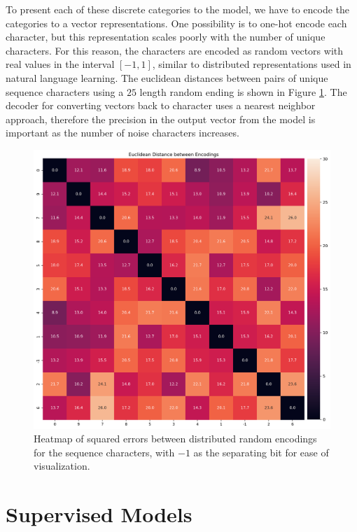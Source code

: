 \documentclass{article}
\begin{document}
To present each of these discrete categories to the model, we have to encode the categories to a vector representations. One possibility is to one-hot encode each character, but this representation scales poorly with the number of unique characters. For this reason, the characters are encoded as random vectors with real values in the interval $\left[-1, 1\right]$, similar to distributed representations used in natural language learning. \cite{mikolov2013distributed} The euclidean distances between pairs of unique sequence characters using a $25$ length random ending is shown in Figure \ref{fig:encoding-distance}. The decoder for converting vectors back to character uses a nearest neighbor approach, therefore the precision in the output vector from the model is important as the number of noise characters increases. 

\begin{figure}[H]
    \centering
    \includegraphics[width=\linewidth]{../notebooks/matrix-distances.png}
    \caption{Heatmap of squared errors between distributed random encodings for the sequence characters, with $-1$ as the separating bit for ease of visualization.}
    \label{fig:encoding-distance}
\end{figure}


\section*{Supervised Models}
\end{document}
